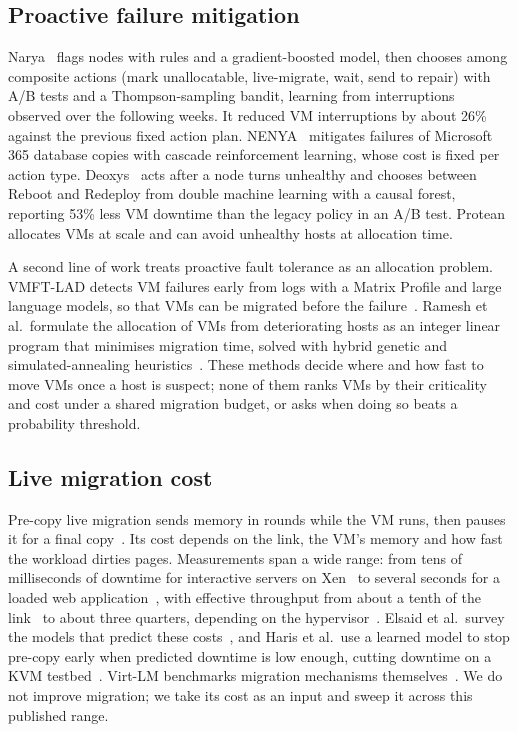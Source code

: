 \documentclass[pdflatex,sn-mathphys-num,iicol]{sn-jnl}
\theoremstyle{thmstyleone}%
\theoremstyle{thmstylethree}%
\begin{document}
\subsection{Proactive failure mitigation}\label{sec:rel-mitig}

Narya~\cite{levy2020narya} flags nodes with rules and a gradient-boosted model, then chooses among
composite actions (mark unallocatable, live-migrate, wait, send to repair) with A/B tests and a
Thompson-sampling bandit, learning from interruptions observed over the following weeks. It
reduced VM interruptions by about 26\% against the previous fixed action plan. NENYA~\cite{wang2022nenya}
mitigates failures of Microsoft 365 database copies with cascade reinforcement learning, whose
cost is fixed per action type. Deoxys~\cite{zhang2024deoxys} acts after a node turns unhealthy and
chooses between Reboot and Redeploy from double machine learning with a causal forest, reporting
53\% less VM downtime than the legacy policy in an A/B test. Protean~\cite{hadary2020protean}
allocates VMs at scale and can avoid unhealthy hosts at allocation time.

A second line of work treats proactive fault tolerance as an allocation problem. VMFT-LAD detects
VM failures early from logs with a Matrix Profile and large language models, so that VMs can be
migrated before the failure~\cite{senevirathne2024vmft}. Ramesh et al.\ formulate the allocation of
VMs from deteriorating hosts as an integer linear program that minimises migration time, solved
with hybrid genetic and simulated-annealing heuristics~\cite{ramesh2024ilp}. These methods decide
where and how fast to move VMs once a host is suspect; none of them ranks VMs by their criticality
and cost under a shared migration budget, or asks when doing so beats a probability threshold.

\subsection{Live migration cost}\label{sec:rel-mig}

Pre-copy live migration sends memory in rounds while the VM runs, then pauses it for a final
copy~\cite{clark2005live}. Its cost depends on the link, the VM's memory and how fast the workload
dirties pages. Measurements span a wide range: from tens of milliseconds of downtime for
interactive servers on Xen~\cite{clark2005live} to several seconds for a loaded web
application~\cite{voorsluys2009cost}, with effective throughput from about a tenth of the link~\cite{clark2005live} to about three
quarters, depending on the hypervisor~\cite{akoush2010predicting,hu2013quantitative}. Elsaid et al.\ survey
the models that predict these costs~\cite{elsaid2021survey}, and Haris et al.\ use a learned model
to stop pre-copy early when predicted downtime is low enough, cutting downtime on a KVM
testbed~\cite{haris2024precopy}. Virt-LM benchmarks migration mechanisms
themselves~\cite{huang2011virtlm}. We do not improve migration; we take its cost as an input and
sweep it across this published range.
\end{document}
